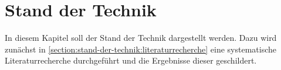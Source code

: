 \chapter{Stand der Technik}\label{section:stand-der-technik}

In diesem Kapitel soll der Stand der Technik dargestellt werden. Dazu wird zunächst in \autoref{section:stand-der-technik:literaturrecherche} eine systematische Literaturrecherche durchgeführt und die Ergebnisse dieser geschildert.



